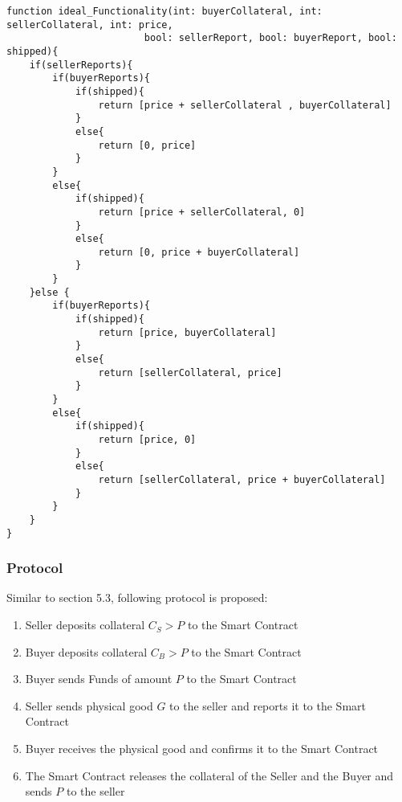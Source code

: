\documentclass{cacthesis}
\begin{document}
\begin{verbatim}
function ideal_Functionality(int: buyerCollateral, int: sellerCollateral, int: price,
                        bool: sellerReport, bool: buyerReport, bool: shipped){
    if(sellerReports){
        if(buyerReports){
            if(shipped){
                return [price + sellerCollateral , buyerCollateral]
            }
            else{
                return [0, price]
            }
        }
        else{
            if(shipped){
                return [price + sellerCollateral, 0]
            }
            else{
                return [0, price + buyerCollateral]
            }
        }
    }else {
        if(buyerReports){
            if(shipped){
                return [price, buyerCollateral]
            }
            else{
                return [sellerCollateral, price]
            }
        }
        else{
            if(shipped){
                return [price, 0]
            }
            else{
                return [sellerCollateral, price + buyerCollateral]
            }
        }    
    }
}
\end{verbatim}

\subsubsection{Protocol}
Similar to section 5.3, following protocol is proposed:
\begin{enumerate}
    \item Seller deposits collateral $C_S > P$ to the Smart Contract
    \item Buyer deposits collateral $C_B > P$ to the Smart Contract
    \item Buyer sends Funds of amount $P$ to the Smart Contract
    \item Seller sends physical good $G$ to the seller and reports it to the Smart Contract
    \item Buyer receives the physical good and confirms it to the Smart Contract
    \item The Smart Contract releases the collateral of the Seller and the Buyer and sends $P$ to the seller
\end{enumerate}
\end{document}

